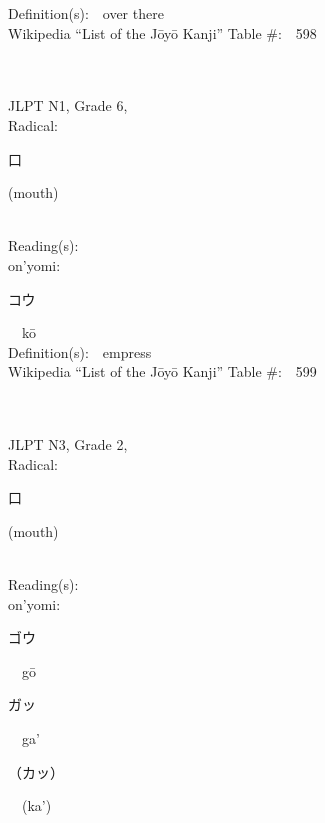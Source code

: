 \begin{multicols}{2}
Definition(s):\ \ over there \\
Wikipedia ``List of the J\=oy\=o Kanji'' Table \#:\ \ 598 \\
\ \ \\
{\fontsize{34pt}{40pt}  }\ \ \\  %
{JLPT N1, Grade 6, \\Radical:\ \ {\begin{CJK}{UTF8}{min} 口 \end{CJK}} (mouth) } \\
Reading(s):\ \ \\
{\hspace*{1em}}on'yomi:\ \ \\
{\hspace*{2em}}{\begin{CJK}{UTF8}{min} コウ \end{CJK}}\ \ k\=o\ \ \\
Definition(s):\ \ empress \\
Wikipedia ``List of the J\=oy\=o Kanji'' Table \#:\ \ 599 \\
\ \ \\
{\fontsize{34pt}{40pt}  }\ \ \\  %
{JLPT N3, Grade 2, \\Radical:\ \ {\begin{CJK}{UTF8}{min} 口 \end{CJK}} (mouth) } \\
Reading(s):\ \ \\
{\hspace*{1em}}on'yomi:\ \ \\
{\hspace*{2em}}{\begin{CJK}{UTF8}{min} ゴウ \end{CJK}}\ \ g\=o\ \ \\
{\hspace*{2em}}{\begin{CJK}{UTF8}{min} ガッ \end{CJK}}\ \ ga'\ \ \\
{\hspace*{2em}}{\begin{CJK}{UTF8}{min} （カッ） \end{CJK}}\ \ (ka')\ \ \\

\end{multicols}
